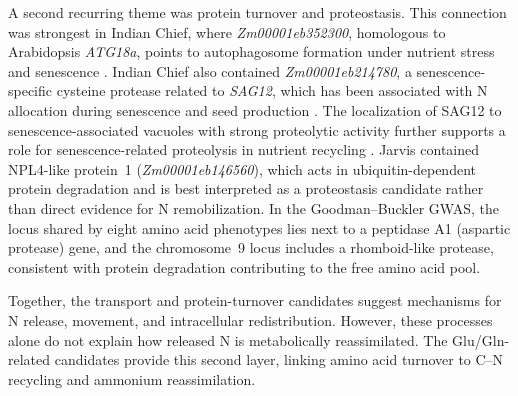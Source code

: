 A second recurring theme was protein turnover and proteostasis. This connection was strongest in Indian Chief, where \textit{Zm00001eb352300}, homologous to Arabidopsis \textit{ATG18a}, points to autophagosome formation under nutrient stress and senescence \citep{Xiong2005ATG18a}. Indian Chief also contained \textit{Zm00001eb214780}, a senescence-specific cysteine protease related to \textit{SAG12}, which has been associated with N allocation during senescence and seed production \citep{James2018SAG12}. The localization of SAG12 to senescence-associated vacuoles with strong proteolytic activity further supports a role for senescence-related proteolysis in nutrient recycling \citep{Otegui2005SAV}. Jarvis contained NPL4-like protein~1 (\textit{Zm00001eb146560}), which acts in ubiquitin-dependent protein degradation and is best interpreted as a proteostasis candidate rather than direct evidence for N remobilization. In the Goodman--Buckler GWAS, the locus shared by eight amino acid phenotypes lies next to a peptidase A1 (aspartic protease) gene, and the chromosome~9 locus includes a rhomboid-like protease, consistent with protein degradation contributing to the free amino acid pool.

Together, the transport and protein-turnover candidates suggest mechanisms for N release, movement, and intracellular redistribution. However, these processes alone do not explain how released N is metabolically reassimilated. The Glu/Gln-related candidates provide this second layer, linking amino acid turnover to C--N recycling and ammonium reassimilation.





